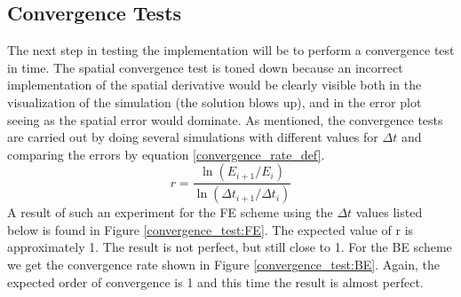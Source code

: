\subsection{Convergence Tests}


The next step in testing the implementation will be to perform a convergence test in time. 
The spatial convergence test is toned down because an incorrect implementation of the spatial derivative would be clearly visible both in the visualization of the simulation (the solution blows up), and in the error plot seeing as the spatial error would dominate.
As mentioned, the convergence tests are carried out by doing several simulations with different values for $\Delta t$ and comparing the errors by equation \ref{convergence_rate_def}. 
\begin{equation}\label{convergence_rate_def}
 r = \frac{\ln(E_{i+1}/E_i)}{\ln(\Delta t_{i+1}/\Delta t_i)}
\end{equation}
A result of such an experiment for the FE scheme using the $\Delta t$ values listed below is found in Figure \ref{convergence_test:FE}. 
The expected value of r is approximately 1. The result is not perfect, but still close to 1. 
For the BE scheme we get the convergence rate shown in Figure \ref{convergence_test:BE}. Again, the expected order of convergence is 1 and this time the result is almost perfect.



